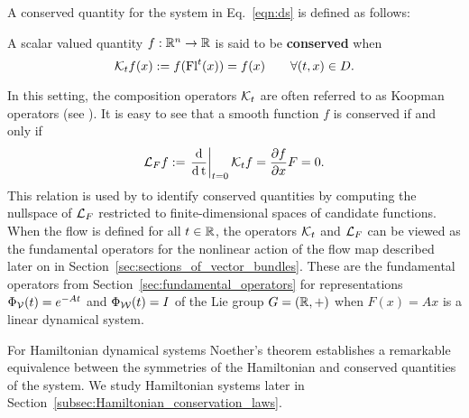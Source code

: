 \documentclass[twoside,11pt]{article}
\begin{document}
A conserved quantity for the system in Eq.~\ref{eqn:ds} is defined as follows:
\begin{definition}
    A scalar valued quantity $f: \mathbb{R}^n \to \mathbb{R}$ is said to be \textbf{conserved} when
    \begin{equation}
        {\mathcal{K}}_t f(x) := f(\operatorname{Fl}^t(x)) = f(x) \qquad \forall (t,x) \in D.
    \end{equation}
\end{definition}
In this setting, the composition operators ${\mathcal{K}}_t$ are often referred to as Koopman operators (see \cite{Koopman1931Hamiltonian, Mezic2005spectral, Mauroy2020koopman, Otto2021koopman, Brunton2022siamreview}).
It is easy to see that a smooth function $f$ is conserved if and only if
\begin{equation}
    {\mathcal{L}}_F f := \left.\operatorname{\frac{\operatorname{\mathrm{d}}}{\operatorname{\mathrm{d}} t}}\right\vert_{t=0} {\mathcal{K}}_t f =  \frac{\partial f}{\partial x} F = 0.
\end{equation}
This relation is used by \cite{Kaiser2018discovering,kaiser2021data} to identify conserved quantities by computing the nullspace of ${\mathcal{L}}_F$ restricted to finite-dimensional spaces of candidate functions.
When the flow is defined for all $t\in\mathbb{R}$, the operators ${\mathcal{K}}_{t}$ and ${\mathcal{L}}_F$ can be viewed as the fundamental operators for the nonlinear action of the flow map described later on in Section~\ref{sec:sections_of_vector_bundles}.
These are the fundamental operators from Section~\ref{sec:fundamental_operators} for representations $\Phi_{{\mathcal{V}}}(t) = e^{-At}$ and $\Phi_{{\mathcal{W}}}(t) = I$ of the Lie group $G=(\mathbb{R},+)$ when $F(x) = A x$ is a linear dynamical system.

\begin{remark}
    For Hamiltonian dynamical systems Noether's theorem establishes a remarkable equivalence between the symmetries of the Hamiltonian and conserved quantities of the system.
    We study Hamiltonian systems later in Section~\ref{subsec:Hamiltonian_conservation_laws}.
\end{remark}
\end{document}
